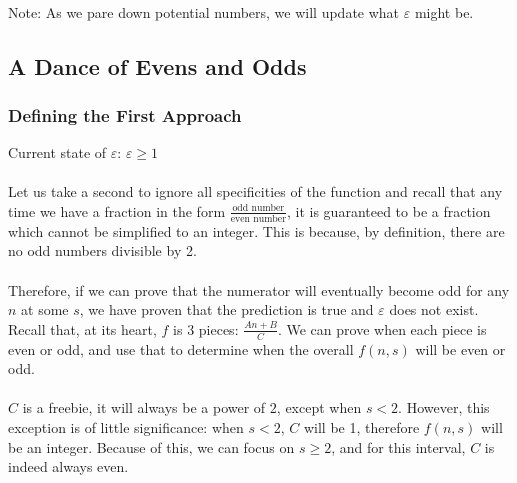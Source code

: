 \documentclass[12pt,letterpaper]{article}
\begin{document}
			\paragraph{} Note: As we pare down potential numbers, we will update what $\varepsilon$ might be.
			
	\subsection{A Dance of Evens and Odds}
			
		\subsubsection{Defining the First Approach}
		
			\begin{figure*}[h]
				\centering
				Current state of $\varepsilon$: $\varepsilon \geqslant 1$
			\end{figure*}
		
			\paragraph{} Let us take a second to ignore all specificities of the function and recall that any time we have a fraction in the form $\frac{\text{odd number}}{\text{even number}}$, it is guaranteed to be a fraction which cannot be simplified to an integer. This is because, by definition, there are no odd numbers divisible by 2.
			
			\paragraph{} Therefore, if we can prove that the numerator will eventually become odd for any $n$ at some $s$, we have proven that the prediction is true and $\varepsilon$ does not exist. Recall that, at its heart, $f$ is 3 pieces: $\frac{An + B}{C}$. We can prove when each piece is even or odd, and use that to determine when the overall $f(n, s)$ will be even or odd.
			
			\paragraph{} $C$ is a freebie, it will always be a power of $2$, except when $s < 2$. However, this exception is of little significance: when $s < 2$, $C$ will be 1, therefore $f(n, s)$ will be an integer. Because of this, we can focus on $s \geqslant 2$, and for this interval, $C$ is indeed always even.
			
\end{document}
